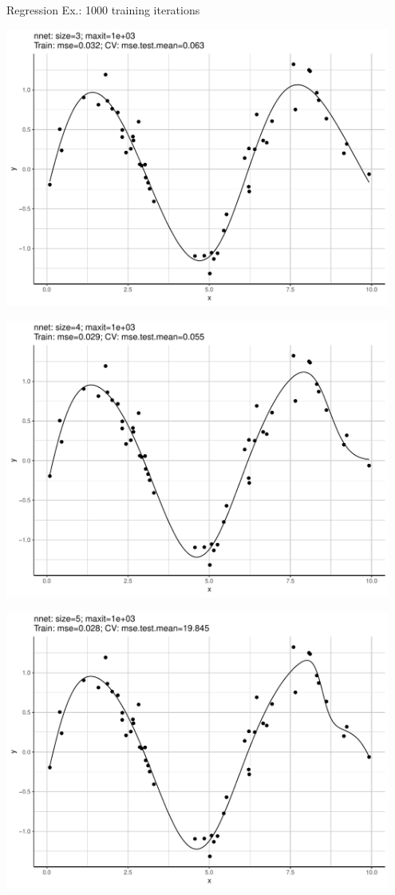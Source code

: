 \documentclass[11pt,compress,t,notes=noshow, xcolor=table]{beamer}
\begin{document}
\begin{vbframe}{Regression Ex.: 1000 training iterations}
\begin{knitrout}
{\centering \includegraphics[width=0.95\textwidth]{figure/unnamed-chunk-5-3} 

}




{\centering \includegraphics[width=0.95\textwidth]{figure/unnamed-chunk-5-4} 

}




{\centering \includegraphics[width=0.95\textwidth]{figure/unnamed-chunk-5-5} 

}
\end{knitrout}
\end{vbframe}
\end{document}

